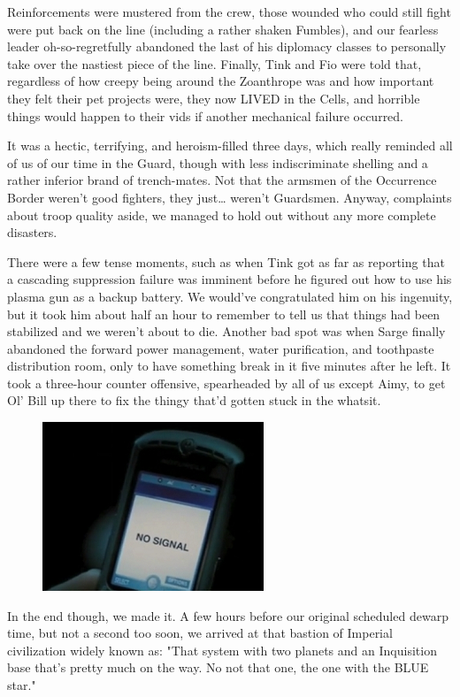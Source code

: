 Reinforcements were mustered from the crew, those wounded who could still fight were put back on the line (including a rather shaken Fumbles), and our fearless leader oh-so-regretfully abandoned the last of his diplomacy classes to personally take over the nastiest piece of the line. 
Finally, Tink and Fio were told that, regardless of how creepy being around the Zoanthrope was and how important they felt their pet projects were, they now LIVED in the Cells, and horrible things would happen to their vids if another mechanical failure occurred. 


It was a hectic, terrifying, and heroism-filled three days, which really reminded all of us of our time in the Guard, though with less indiscriminate shelling and a rather inferior brand of trench-mates. 
Not that the armsmen of the Occurrence Border weren't good fighters, they just… weren't Guardsmen. 
Anyway, complaints about troop quality aside, we managed to hold out without any more complete disasters. 


There were a few tense moments, such as when Tink got as far as reporting that a cascading suppression failure was imminent before he figured out how to use his plasma gun as a backup battery. 
We would've congratulated him on his ingenuity, but it took him about half an hour to remember to tell us that things had been stabilized and we weren't about to die. 
Another bad spot was when Sarge finally abandoned the forward power management, water purification, and toothpaste distribution room, only to have something break in it five minutes after he left. 
It took a three-hour counter offensive, spearheaded by all of us except Aimy, to get Ol' Bill up there to fix the thingy that'd gotten stuck in the whatsit.

\begin{figure}
	\begin{center}
		\includegraphics[width=\figwidth]{pics/15/20.png}
	\end{center}
\end{figure}
In the end though, we made it. 
A few hours before our original scheduled dewarp time, but not a second too soon, we arrived at that bastion of Imperial civilization widely known as: 
"That system with two planets and an Inquisition base that's pretty much on the way. 
No not that one, the one with the BLUE star." 

